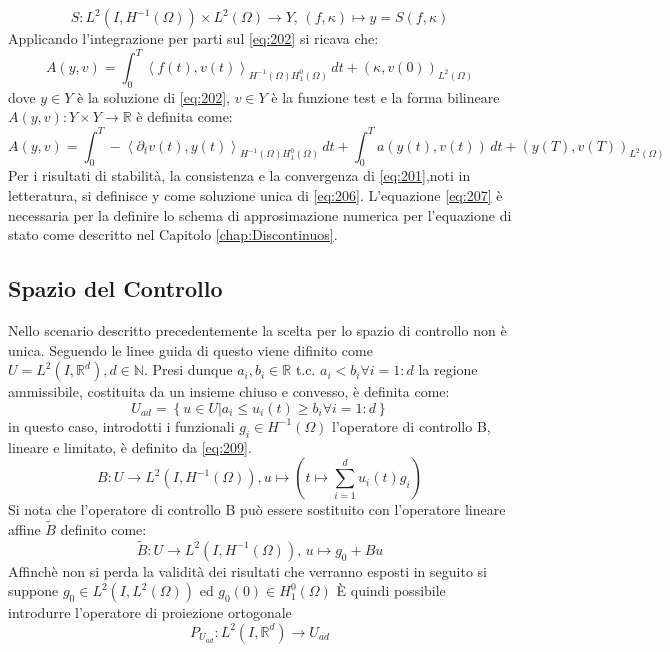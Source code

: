\begin{equation}
S : L^2(I,{H^{-1}(\Omega)}) \times {L^{2}(\Omega)} \rightarrow Y \text{, } (f,\kappa) \longmapsto y = S(f,\kappa)
\label{eq:S}
\end{equation}
Applicando l'integrazione per parti sul \ref{eq:202} si ricava che:
\begin{equation}
A(y,v) = \int_{0}^{T} \left \langle f(t),v(t) \right \rangle_{{H^{-1}(\Omega)}{H^{0}_{1}(\Omega)}} \, dt + ({\kappa},v(0))_{L^{2}(\Omega)}
\label{eq:206}
\end{equation}
dove $y{\in}Y$ è la soluzione di \ref{eq:202}, $v{\in}Y$ è la funzione test e la forma bilineare $A(y,v): Y{\times}Y\rightarrow\mathbb{R}$ è definita come:
\begin{equation}
 A(y,v) = \int_{0}^{T} -\left \langle {\partial_{t}}v(t),y(t) \right \rangle_{{H^{-1}(\Omega)}{H^{0}_{1}(\Omega)}} \, dt + \int_{0}^{T} a(y(t),v(t)) \, dt + (y(T),v(T))_{L^{2}(\Omega)}
\label{eq:207}
\end{equation}
Per i risultati di stabilità, la consistenza e la convergenza di \ref{eq:201},noti in letteratura, si definisce y come soluzione unica di \ref{eq:206}. L'equazione \ref{eq:207} è necessaria per la definire  lo schema di approsimazione numerica per l'equazione di stato come descritto nel Capitolo \ref{chap:Discontinuos}.

\subsection{Spazio del Controllo}
Nello scenario descritto precedentemente la scelta per lo spazio di controllo non è unica. Seguendo le linee guida di \cite{MAIN} questo viene difinito come $U = L^2(I,\mathbb{R}^d), d \in \mathbb{N}$. Presi dunque $a_i, b_i \in \mathbb{R}$ t.c. $a_i<b_i {\forall}i=1:d$ la regione ammissibile, costituita da un insieme chiuso e convesso, è definita come:
\begin{equation}
U_{ad} = \left\{ u \in U | a_i \leq u_i(t) \geq b_i {\forall}i=1:d  \right\}
\label{eq:208}
\end{equation}
in questo caso, introdotti i funzionali $g_i \in {H^{-1}(\Omega)}$ l'operatore di controllo B, lineare e limitato, è definito da \ref{eq:209}.
\begin{equation}
B : U \rightarrow L^2(I,{H^{-1}(\Omega)}), u\mapsto \left( t\mapsto\sum_{i=1}^d u_i(t)g_i \right)
\label{eq:209}
\end{equation}
Si nota che l'operatore di controllo B può essere sostituito con l'operatore lineare affine $\tilde{B}$ definito come:
\begin{equation}
\tilde{B} : U \rightarrow L^2(I,{H^{-1}(\Omega)}) \text{, } u\mapsto g_0 + Bu
\label{eq:210}
\end{equation}
Affinchè non si perda la validità dei risultati che verranno esposti in seguito si suppone $g_0 \in L^2(I,{L^{2}(\Omega)})$ ed $g_0(0) \in {H^{0}_{1}(\Omega)}$
\MakeUppercase{è} quindi possibile introdurre l'operatore di proiezione ortogonale 
\begin{equation}
P_{U_{ad}} : L^2(I,\mathbb{R}^d)\rightarrow U_{ad}
\label{eq:211}
\end{equation}


